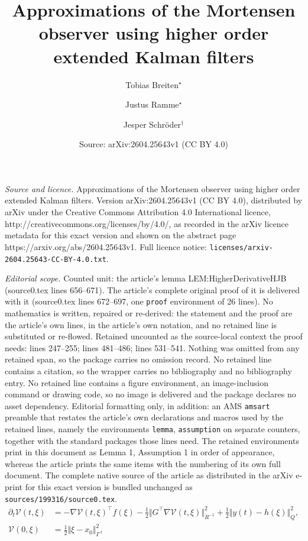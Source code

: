 \documentclass[10pt,a4paper]{amsart}
\title{Approximations of the Mortensen observer using higher order extended Kalman filters}
\author{Tobias Breiten${}^{\star}$ \and Justus Ramme${}^\star$ \and Jesper Schr\"oder${}^\dagger$}
\date{Source: arXiv:2604.25643v1 (CC BY 4.0)}
\begin{document}
\maketitle

\noindent\emph{Source and licence.} Approximations of the Mortensen observer using higher order extended Kalman filters. Version arXiv:2604.25643v1 (CC BY 4.0), distributed by arXiv under the Creative Commons Attribution 4.0 International licence, http://creativecommons.org/licenses/by/4.0/, as recorded in the arXiv licence metadata for this exact version and shown on the abstract page https://arxiv.org/abs/2604.25643v1. Full licence notice: \texttt{licenses/arxiv-2604.25643-CC-BY-4.0.txt}.\par\smallskip

\noindent\textit{Editorial scope.} Counted unit: the article's lemma LEM:HigherDerivativeHJB (source0.tex lines 656--671). The article's complete original proof of it is delivered with it (source0.tex lines 672--697, one \texttt{proof} environment of 26 lines). No mathematics is written, repaired or re-derived: the statement and the proof are the article's own lines, in the article's own notation, and no retained line is substituted or re-flowed.  Retained uncounted as the source-local context the proof needs: lines 247--255; lines 481--486; lines 531--541.  Nothing was omitted from any retained span, so the package carries no omission record.  No retained line contains a citation, so the wrapper carries no bibliography and no bibliography entry.  No retained line contains a figure environment, an image-inclusion command or drawing code, so no image is delivered and the package declares no asset dependency.  Editorial formatting only, in addition: an AMS \texttt{amsart} preamble that restates the article's own declarations and macros used by the retained lines, namely the environments \texttt{lemma}, \texttt{assumption} on separate counters, together with the standard packages those lines need.  The retained environments print in this document as Lemma 1, Assumption 1 in order of appearance, whereas the article prints the same items with the numbering of its own full document.  The complete native source of the article as distributed in the arXiv e-print for this exact version is bundled unchanged as \texttt{sources/199316/source0.tex}.
\begin{equation}\label{eq: HJB}
	\begin{aligned}
		\partial_t \mathcal{V}(t,\xi) &=
		-\nabla \mathcal{V}(t,\xi)^\top f(\xi) 
		- \frac{1}{2} \Vert G^\top \nabla \mathcal{V}(t,\xi) \Vert_{R^{-1}}^2
		+ \frac{1}{2} \Vert y(t) - h(\xi) \Vert_Q^2,\\
		\mathcal{V}(0,\xi) &= \frac{1}{2} \Vert \xi - x_0 \Vert_\Gamma^2,
	\end{aligned}
\end{equation}
\end{document}
